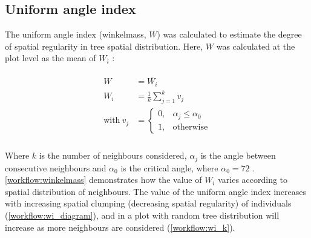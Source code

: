 \begin{refsection}
\subsection{Uniform angle index}
\label{workflow:ssec:winkel}

The uniform angle index (winkelmass, $W$) was calculated to estimate the degree of spatial regularity in tree spatial distribution. Here, $W$ was calculated at the plot level as the mean of $W_{i}$ \citep{Gadow2002}: 

\begin{align}
\begin{split}
	W &= \overline{W_{i}} \\
	W_{i} &= \frac{1}{k} \sum_{j=1}^{k} v_{j} \\
	\text{with}\ v_{j} &= \begin{cases}
		0,& \alpha_{j} \le \alpha_{0} \\
		1,& \text{otherwise}
	\end{cases} \\
\end{split}
\end{align}

Where $k$ is the number of neighbours considered, $\alpha_{j}$ is the angle between consecutive neighbours and $\alpha_{0}$ is the critical angle, where $\alpha_{0} = 72$\textdegree{} \citep{Hui2002}. \autoref{workflow:winkelmass} demonstrates how the value of $W_{i}$ varies according to spatial distribution of neighbours. The value of the uniform angle index increases with increasing spatial clumping (decreasing spatial regularity) of individuals (\autoref{workflow:wi_diagram}), and in a plot with random tree distribution will increase as more neighbours are considered (\autoref{workflow:wi_k}). 


\end{refsection}

